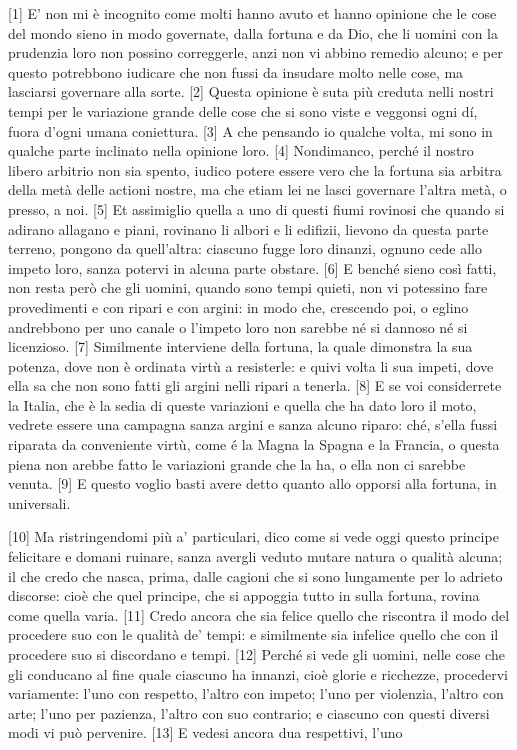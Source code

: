 
{[}1{]} E' non mi è incognito come molti hanno avuto et hanno opinione
che le cose del mondo sieno in modo governate, dalla fortuna e da Dio,
che li uomini con la prudenzia loro non possino correggerle, anzi non vi
abbino remedio alcuno; e per questo potrebbono iudicare che non fussi da
insudare molto nelle cose, ma lasciarsi governare alla sorte. {[}2{]}
Questa opinione è suta più creduta nelli nostri tempi per le variazione
grande delle cose che si sono viste e veggonsi ogni dí, fuora d'ogni
umana coniettura. {[}3{]} A che pensando io qualche volta, mi sono in
qualche parte inclinato nella opinione loro. {[}4{]} Nondimanco, perché
il nostro libero arbitrio non sia spento, iudico potere essere vero che
la fortuna sia arbitra della metà delle actioni nostre, ma che etiam lei
ne lasci governare l'altra metà, o presso, a noi. {[}5{]} Et assimiglio
quella a uno di questi fiumi rovinosi che quando si adirano allagano e
piani, rovinano li albori e li edifizii, lievono da questa parte
terreno, pongono da quell'altra: ciascuno fugge loro dinanzi, ognuno
cede allo impeto loro, sanza potervi in alcuna parte obstare. {[}6{]} E
benché sieno così fatti, non resta però che gli uomini, quando sono
tempi quieti, non vi potessino fare provedimenti e con ripari e con
argini: in modo che, crescendo poi, o eglino andrebbono per uno canale o
l'impeto loro non sarebbe né si dannoso né si licenzioso. {[}7{]}
Similmente interviene della fortuna, la quale dimonstra la sua potenza,
dove non è ordinata virtù a resisterle: e quivi volta li sua impeti,
dove ella sa che non sono fatti gli argini nelli ripari a tenerla.
{[}8{]} E se voi considerrete la Italia, che è la sedia di queste
variazioni e quella che ha dato loro il moto, vedrete essere una
campagna sanza argini e sanza alcuno riparo: ché, s'ella fussi riparata
da conveniente virtù, come é la Magna la Spagna e la Francia, o questa
piena non arebbe fatto le variazioni grande che la ha, o ella non ci
sarebbe venuta. {[}9{]} E questo voglio basti avere detto quanto allo
opporsi alla fortuna, in universali.

{[}10{]} Ma ristringendomi più a' particulari, dico come si vede oggi
questo principe felicitare e domani ruinare, sanza avergli veduto mutare
natura o qualità alcuna; il che credo che nasca, prima, dalle cagioni
che si sono lungamente per lo adrieto discorse: cioè che quel principe,
che si appoggia tutto in sulla fortuna, rovina come quella varia.
{[}11{]} Credo ancora che sia felice quello che riscontra il modo del procedere suo con le qualità de' tempi: e similmente sia infelice quello che con il procedere suo si discordano e tempi. {[}12{]} Perché si vede gli uomini, nelle cose che gli conducano al fine quale ciascuno ha innanzi, cioè glorie e ricchezze, procedervi variamente: l'uno con respetto, l'altro con impeto; l'uno per violenzia, l'altro con arte; l'uno per pazienza, l'altro con suo contrario; e ciascuno con questi diversi modi vi può pervenire.
{[}13{]} E vedesi ancora dua respettivi, l'uno \linebreak

